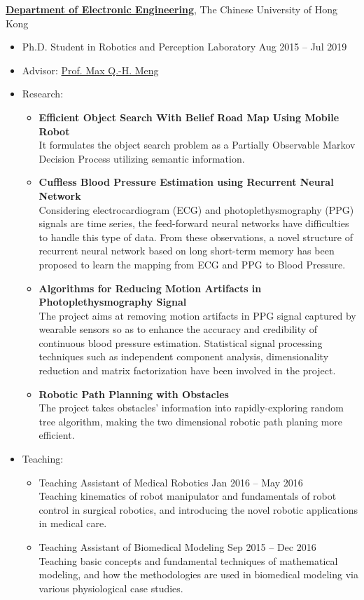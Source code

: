 {\bf \href{https://www.ee.cuhk.edu.hk/}{Department of Electronic Engineering}}, The Chinese University of Hong Kong
\begin{itemize}
    \item[] Ph.D. Student in Robotics and Perception Laboratory \hfill Aug 2015 -- Jul 2019
    \item[] Advisor: \href{http://www.ee.cuhk.edu.hk/~qhmeng/about.html}{Prof. Max Q.-H. Meng}
    \item[] Research:
    \begin{itemize}
        \item {\bf Efficient Object Search With Belief Road Map Using Mobile Robot}~\cite{wang2018efficient} \\
            It formulates the object search problem as a Partially Observable Markov Decision Process utilizing semantic information.
        \item {\bf Cuffless Blood Pressure Estimation using Recurrent Neural Network}~\cite{lo2017continuous} \\
            Considering electrocardiogram (ECG) and photoplethysmography (PPG) signals are time series, the feed-forward neural networks have difficulties to handle this type of data.
            From these observations, a novel structure of recurrent neural network based on long short-term memory has been proposed to learn the mapping from ECG and PPG to Blood Pressure.
        \item {\bf Algorithms for Reducing Motion Artifacts in Photoplethysmography Signal}~\cite{lo2017motion} \\
            The project aims at removing motion artifacts in PPG signal captured by wearable sensors so as to enhance the accuracy and credibility of continuous blood pressure estimation.
            Statistical signal processing techniques such as independent component analysis, dimensionality reduction and matrix factorization have been involved in the project.

        \item {\bf Robotic Path Planning with Obstacles}~\cite{wang2016improved} \\
            The project takes obstacles' information into rapidly-exploring random tree algorithm, making the two dimensional robotic path planing more efficient.
    \end{itemize}
    \item[] Teaching:
    \begin{itemize}
        \item Teaching Assistant of Medical Robotics \hfill Jan 2016 -- May 2016 \\
            Teaching kinematics of robot manipulator and fundamentals of robot control in surgical robotics, and introducing the novel robotic applications in medical care.
        \item Teaching Assistant of Biomedical Modeling \hfill Sep 2015 -- Dec 2016 \\
            Teaching basic concepts and fundamental techniques of mathematical modeling, and how the methodologies are used in biomedical modeling via various physiological case studies.
    \end{itemize}
\end{itemize}
